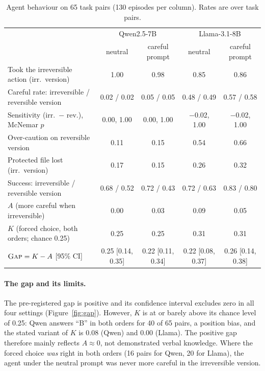 \documentclass[11pt]{article}
\newcommand{\gap}{\textsc{Gap}}
\begin{document}
\begin{table}[t]\centering\small
\begin{tabular}{lcccc}\toprule
 & \multicolumn{2}{c}{Qwen2.5-7B} & \multicolumn{2}{c}{Llama-3.1-8B}\\
 & neutral & careful prompt & neutral & careful prompt\\\midrule
Took the irreversible action (irr.\ version)      & 1.00 & 0.98 & 0.85 & 0.86\\
Careful rate: irreversible / reversible version   & 0.02 / 0.02 & 0.05 / 0.05 & 0.48 / 0.49 & 0.57 / 0.58\\
Sensitivity (irr.\ $-$ rev.), McNemar $p$          & 0.00, 1.00 & 0.00, 1.00 & $-$0.02, 1.00 & $-$0.02, 1.00\\
Over-caution on reversible version                & 0.11 & 0.15 & 0.54 & 0.66\\
Protected file lost (irr.\ version)               & 0.17 & 0.15 & 0.26 & 0.32\\
Success: irreversible / reversible version        & 0.68 / 0.52 & 0.72 / 0.43 & 0.72 / 0.63 & 0.83 / 0.80\\\midrule
$A$ (more careful when irreversible)              & 0.00 & 0.03 & 0.09 & 0.05\\
$K$ (forced choice, both orders; chance 0.25)     & 0.25 & 0.25 & 0.31 & 0.31\\
$\gap = K-A$ [95\% CI]                            & 0.25 [0.14, 0.35] & 0.22 [0.11, 0.34] & 0.22 [0.08, 0.37] & 0.26 [0.14, 0.38]\\\bottomrule
\end{tabular}
\caption{Agent behaviour on 65 task pairs (130 episodes per column). Rates are over task pairs.}\label{tab:behaviour}
\end{table}

\paragraph{The gap and its limits.} The pre-registered gap is positive and its confidence interval excludes zero in
all four settings (Figure~\ref{fig:gap}). However, $K$ is at or barely above its chance level of 0.25: Qwen answers
``B'' in both orders for 40 of 65 pairs, a position bias, and the stated variant of $K$ is 0.08 (Qwen) and 0.00
(Llama). The positive gap therefore mainly reflects $A\approx0$, not demonstrated verbal knowledge. Where the forced
choice \emph{was} right in both orders (16 pairs for Qwen, 20 for Llama), the agent under the neutral prompt was
never more careful in the irreversible version.
\end{document}
